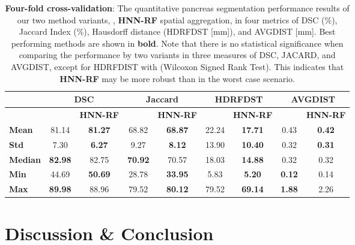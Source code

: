 \documentclass[journal]{IEEEtran}
\begin{document}
\begin{table*}[htb]
\begin{center}
\caption{\small \textbf{Four-fold cross-validation}: The quantitative pancreas segmentation performance results of our two method variants, , \textbf{HNN-RF} spatial aggregation, in four metrics of DSC (\%), Jaccard Index (\%), Hausdorff distance (HDRFDST [mm]), and AVGDIST [mm]. Best performing methods are shown in \textbf{bold}. Note that there is no statistical significance when comparing the performance by two variants in three measures of DSC, JACARD, and AVGDIST, except for HDRFDIST with  (Wilcoxon Signed Rank Test). This indicates that \textbf{HNN-RF} may be more robust than  in the worst case scenario.}
\label{tab:results2}
\begin{tabular}{l|c|c|c|c|c|c|c|c}
    \toprule
		\toprule
    ~ & \multicolumn{2}{|c|}{DSC} & \multicolumn{2}{|c|}{Jaccard} & \multicolumn{2}{|c|}{HDRFDST}  & \multicolumn{2}{|c|}{AVGDIST} \\
		\midrule 
		~ &  & \textbf{HNN-RF} &  & \textbf{HNN-RF} &  & \textbf{HNN-RF} &  & \textbf{HNN-RF} \\	
		\midrule 	
\textbf{Mean}	    &81.14 & \textbf{81.27}   &68.82 &\textbf{68.87}    &22.24 & \textbf{17.71}   &0.43 & \textbf{0.42}   \\
\textbf{Std}      &7.30  & \textbf{6.27}  	&9.27  &\textbf{8.12}     &13.90 & \textbf{10.40}   &0.32 & \textbf{0.31}  \\
\textbf{Median}   &\textbf{82.98} & 82.75		&\textbf{70.92} &70.57    &18.03 & \textbf{14.88}	  &0.32	&	0.32	\\
\textbf{Min}	    &44.69 & \textbf{50.69} 	&28.78 &\textbf{33.95}    &5.83  & \textbf{5.20}	  &\textbf{0.12}		&0.14 \\
\textbf{Max}	    &\textbf{89.98} & 88.96  	&79.52 &\textbf{80.12}    &79.52 & \textbf{69.14}   &\textbf{1.88}		&2.26 \\
    \bottomrule
		\bottomrule
\end{tabular}\end{center} 
\end{table*}\section{Discussion \& Conclusion}\label{sec:discussion}
\end{document}
